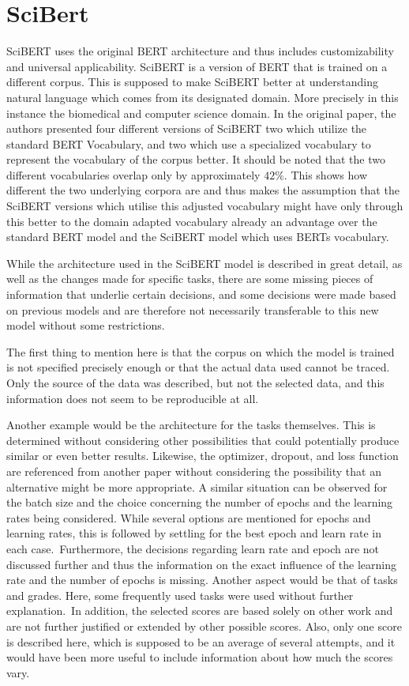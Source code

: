 \chapter{SciBert}
SciBERT uses the original BERT architecture and thus includes customizability and universal applicability. SciBERT is a version of BERT that is trained on a different corpus. This is supposed to make SciBERT better at understanding natural language which comes from its designated domain. More precisely in this instance the biomedical and computer science domain. In the original paper, the authors presented four different versions of SciBERT two which utilize the standard BERT Vocabulary, and two which use a specialized vocabulary to represent the vocabulary of the corpus better. It should be noted that the two different vocabularies overlap only by approximately $42\%$. This shows how different the two underlying corpora are and thus makes the assumption that the SciBERT versions which utilise this adjusted vocabulary might have only through this better to the domain adapted vocabulary already an advantage over the standard BERT model and the SciBERT model which uses BERTs vocabulary.


While the architecture used in the SciBERT model is described in great detail, as well as the changes made for specific tasks, there are some missing pieces of information that underlie certain decisions, and some decisions were made based on previous models and are therefore not necessarily transferable to this new model without some restrictions.

The first thing to mention here is that the corpus on which the model is trained is not specified precisely enough or that the actual data used cannot be traced.  Only the source of the data was described, but not the selected data, and this information does not seem to be reproducible at all.

Another example would be the architecture for the tasks themselves. This is determined without considering other possibilities that could potentially produce similar or even better results. Likewise, the optimizer, dropout, and loss function are referenced from another paper without considering the possibility that an alternative might be more appropriate. A similar situation can be observed for the batch size and the choice concerning the number of epochs and the learning rates being considered. While several options are mentioned for epochs and learning rates, this is followed by settling for the best epoch and learn rate in each case. Furthermore, the decisions regarding learn rate and epoch are not discussed further and thus the information on the exact influence of the learning rate and the number of epochs is missing.
Another aspect would be that of tasks and grades. Here, some frequently used tasks were used without further explanation. In addition, the selected scores are based solely on other work and are not further justified or extended by other possible scores. Also, only one score is described here, which is supposed to be an average of several attempts, and it would have been more useful to include information about how much the scores vary.  

